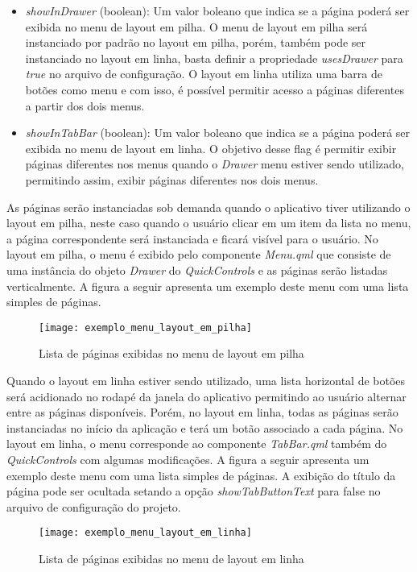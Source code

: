 \begin{itemize}
	\item \textit{showInDrawer} (boolean): Um valor boleano que indica se a página poderá ser exibida no menu de layout em pilha. O menu de layout em pilha será instanciado por padrão no layout em pilha, porém, também pode ser instanciado no layout em linha, basta definir a propriedade \textit{usesDrawer} para \textit{true} no arquivo de configuração. O layout em linha utiliza uma barra de botões como menu e com isso, é possível permitir acesso a páginas diferentes a partir dos dois menus.

	\item \textit{showInTabBar} (boolean): Um valor boleano que indica se a página poderá ser exibida no menu de layout em linha. O objetivo desse flag é permitir exibir páginas diferentes nos menus quando o \textit{Drawer} menu estiver sendo utilizado, permitindo assim, exibir páginas diferentes nos dois menus.
\end{itemize}

As páginas serão instanciadas sob demanda quando o aplicativo tiver utilizando o layout em pilha, neste caso quando o usuário clicar em um item da lista no menu, a página correspondente será instanciada e ficará visível para o usuário. No layout em pilha, o menu é exibido pelo componente \textit{Menu.qml} que consiste de uma instância do objeto \textit{Drawer} do \textit{QuickControls} e as páginas serão listadas verticalmente. A figura a seguir apresenta um exemplo deste menu com uma lista simples de páginas.

\begin{figure}[H]
	\texttt{[image: exemplo\_menu\_layout\_em\_pilha]}
	\centering
	\caption{Lista de páginas exibidas no menu de layout em pilha}
\end{figure}

Quando o layout em linha estiver sendo utilizado, uma lista horizontal de botões será acidionado no rodapé da janela do aplicativo permitindo ao usuário alternar entre as páginas disponíveis. Porém, no layout em linha, todas as páginas serão instanciadas no início da aplicação e terá um botão associado a cada página. No layout em linha, o menu corresponde ao componente \textit{TabBar.qml} também do \textit{QuickControls} com algumas modificações. A figura a seguir apresenta um exemplo deste menu com uma lista simples de páginas. A exibição do título da página pode ser ocultada setando a opção \textit{showTabButtonText} para false no arquivo de configuração do projeto.

\begin{figure}[H]
	\texttt{[image: exemplo\_menu\_layout\_em\_linha]}
	\centering
	\caption{Lista de páginas exibidas no menu de layout em linha}
\end{figure}


